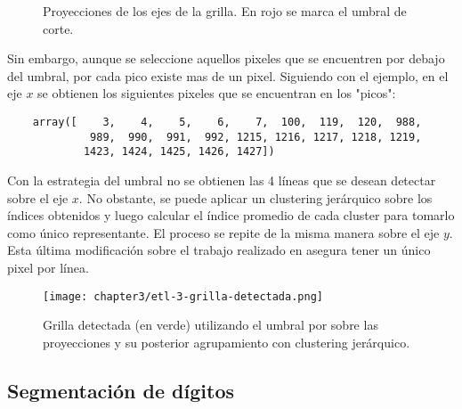\begin{figure}
    \centering



    \caption{Proyecciones de los ejes de la grilla. En rojo se marca el umbral de corte.}
    \label{fig:etl-3-proyecciones}
\end{figure}

Sin embargo, aunque se seleccione aquellos pixeles que se encuentren por debajo del umbral, por cada pico existe mas de
un pixel. Siguiendo con el ejemplo, en el eje $x$ se obtienen los siguientes pixeles que se encuentran en los "picos":

\begin{verbatim}
    array([    3,    4,    5,    6,    7,  100,  119,  120,  988, 
             989,  990,  991,  992, 1215, 1216, 1217, 1218, 1219, 
            1423, 1424, 1425, 1426, 1427])
\end{verbatim}

Con la estrategia del umbral no se obtienen las 4 l\'ineas que se desean detectar sobre el eje $x$. No obstante, se
puede aplicar un clustering jer\'arquico sobre los \'indices obtenidos y luego calcular el \'indice promedio de cada
cluster para tomarlo como \'unico representante. El proceso se repite de la misma manera sobre el eje $y$. Esta
\'ultima modificaci\'on sobre el trabajo realizado en \parencite{lamagna2016lectura} asegura tener un \'unico pixel por l\'inea.

\begin{figure}[H]
    \centering
    \texttt{[image: chapter3/etl-3-grilla-detectada.png]}
    \caption{Grilla detectada (en verde) utilizando el umbral por sobre las proyecciones y su posterior agrupamiento con clustering jer\'arquico.}
    \label{fig:etl-3-grilla-detectada}
\end{figure}

\subsection{Segmentaci\'on de d\'igitos}

